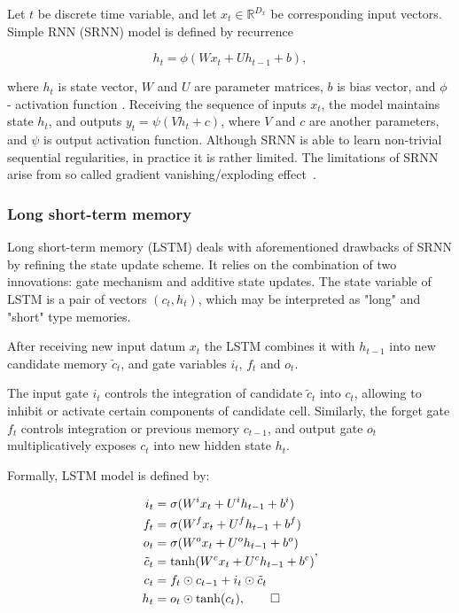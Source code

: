 \documentclass[a4paper,11pt]{article}
\begin{document}
Let $t$ be discrete time variable, and let $x_{t} \in \mathbb{R}^{D_{x}}$ be corresponding input vectors. Simple RNN (SRNN) model is defined by 
recurrence 

\begin{equation}
\label{eq:SRNN}
h_{t} = \phi(Wx_{t} + Uh_{t-1} + b),
\end{equation}

\noindent where $h_{t}$ is state vector, $W$ and $U$ are parameter matrices, $b$ is bias vector, and $\phi$ - activation function \cite{Elman}. 
Receiving the sequence of inputs $x_{t}$, the model maintains  state $h_{t}$, and 
outputs $y_{t} = \psi(Vh_{t} + c)$, where $V$ and $c$ are another parameters, and $\psi$ is output activation function. Although SRNN is able to learn non-trivial sequential regularities, in practice it is rather limited. The limitations of SRNN arise from so called gradient vanishing/exploding effect~\cite{Bengio}.



\subsubsection{Long short-term memory}


Long short-term memory (LSTM) \cite{Hochreiter} deals with aforementioned drawbacks of SRNN by refining the state update scheme. It relies on the combination of two innovations: gate mechanism and additive state updates. The state  variable of LSTM is a pair of vectors $(c_{t}, h_{t})$, which may be interpreted as "long" and "short" type memories. %


After receiving new input datum $x_{t}$ the LSTM combines it with $h_{t-1}$ into new candidate memory $
\tilde{c}_{t}$, and gate variables $i_{t}$, $f_{t}$ and $o_{t}$. 

The input gate $i_{t}$ controls the integration of candidate $\tilde{c}_{t}$ into $c_{t}$, allowing to 
inhibit or activate certain components of candidate cell. Similarly, the forget gate $f_{t}$ controls integration or previous memory $c_{t-1}$, 
and output gate $o_{t}$ multiplicatively exposes $c_{t}$ into new hidden state $h_{t}$.

Formally, LSTM model is defined by:

\begin{align}
\begin{split}
\label{LSTM}
i_{t} &=\sigma(W^{i}x_{t} + U^{i}h_{t-1} + b^{i})\\
f_{t} &=\sigma(W^{f}x_{t} + U^{f}h_{t-1} + b^{f})\\
o_{t} &=\sigma(W^{o}x_{t} + U^{o}h_{t-1} + b^{o})\\
\tilde{c}_{t} &= \tanh(W^{c}x_{t} + U^{c}h_{t-1} + b^{c})\\
c_{t} &=f_{t} \odot c_{t-1} + i_{t} \odot \tilde{c}_{t}\\
h_{t} &=o_{t} \odot \tanh(c_{t}), \qedhere
\end{split},
\end{align}
\end{document}
